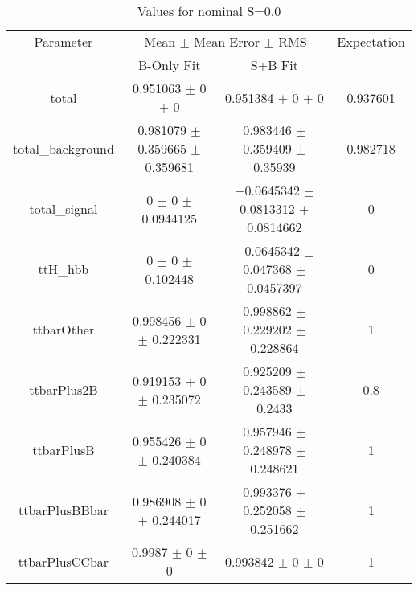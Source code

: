 \begin{table}
\centering
\caption{Values for nominal S=0.0}
\begin{tabular}{cccc}
\toprule
Parameter & \multicolumn{2}{c}{Mean $\pm$ Mean Error $\pm$ RMS} & Expectation\\
 & B-Only Fit & S+B Fit & \\
\midrule
total & \num{0.951063} $\pm$ \num{0} $\pm$ \num{0} & \num{0.951384} $\pm$ \num{0} $\pm$ \num{0} & \num{0.937601}\\
total\_background & \num{0.981079} $\pm$ \num{0.359665} $\pm$ \num{0.359681} & \num{0.983446} $\pm$ \num{0.359409} $\pm$ \num{0.35939} & \num{0.982718}\\
total\_signal & \num{0} $\pm$ \num{0} $\pm$ \num{0.0944125} & \num{-0.0645342} $\pm$ \num{0.0813312} $\pm$ \num{0.0814662} & \num{0}\\
ttH\_hbb & \num{0} $\pm$ \num{0} $\pm$ \num{0.102448} & \num{-0.0645342} $\pm$ \num{0.047368} $\pm$ \num{0.0457397} & \num{0}\\
ttbarOther & \num{0.998456} $\pm$ \num{0} $\pm$ \num{0.222331} & \num{0.998862} $\pm$ \num{0.229202} $\pm$ \num{0.228864} & \num{1}\\
ttbarPlus2B & \num{0.919153} $\pm$ \num{0} $\pm$ \num{0.235072} & \num{0.925209} $\pm$ \num{0.243589} $\pm$ \num{0.2433} & \num{0.8}\\
ttbarPlusB & \num{0.955426} $\pm$ \num{0} $\pm$ \num{0.240384} & \num{0.957946} $\pm$ \num{0.248978} $\pm$ \num{0.248621} & \num{1}\\
ttbarPlusBBbar & \num{0.986908} $\pm$ \num{0} $\pm$ \num{0.244017} & \num{0.993376} $\pm$ \num{0.252058} $\pm$ \num{0.251662} & \num{1}\\
ttbarPlusCCbar & \num{0.9987} $\pm$ \num{0} $\pm$ \num{0} & \num{0.993842} $\pm$ \num{0} $\pm$ \num{0} & \num{1}\\
\bottomrule
\end{tabular}
\end{table}